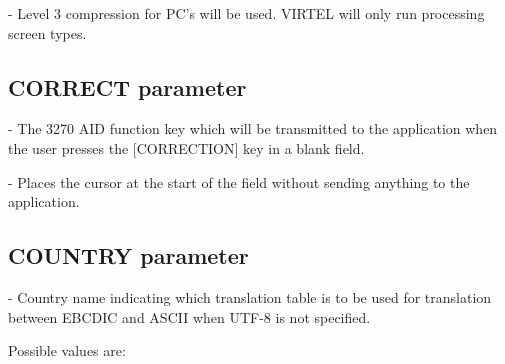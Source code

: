 \documentclass[letterpaper,10pt,english]{sphinxmanual}
\begin{document}
 - Level 3 compression for PC’s will be used. VIRTEL will only run processing screen types.

\ignorespaces 

\subsection{CORRECT parameter}
\label{\detokenize{Installation_Guide:correct-parameter}}\label{\detokenize{Installation_Guide:index-47}}
\begin{sphinxVerbatim}[commandchars=\\\{\}]
  
\end{sphinxVerbatim}

 - The 3270 AID function key which will be transmitted to the application when the user presses the {[}CORRECTION{]} key in a blank field.

 - Places the cursor at the start of the field without sending anything to the application.

\ignorespaces 

\subsection{COUNTRY parameter}
\label{\detokenize{Installation_Guide:country-parameter}}\label{\detokenize{Installation_Guide:index-48}}
\begin{sphinxVerbatim}[commandchars=\\\{\}]
 
\end{sphinxVerbatim}

 - Country name indicating which translation table is to be used for translation between EBCDIC and ASCII when UTF-8 is not specified.

Possible values are:
\end{document}
